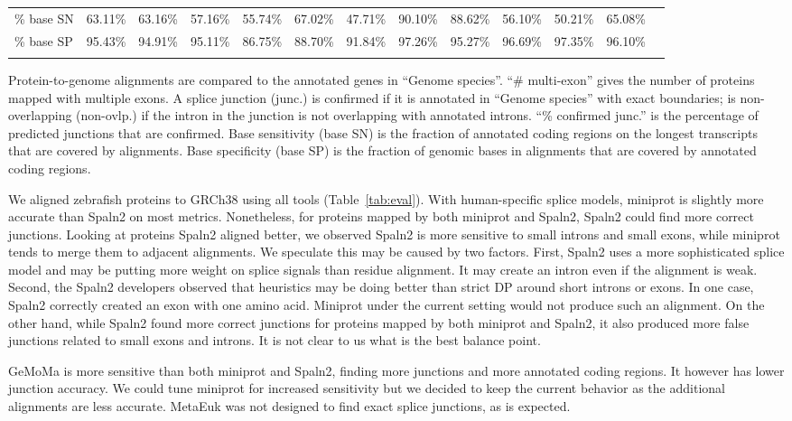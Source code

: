 \documentclass{bioinfo}
\begin{document}
\begin{table*}[!tb]
{\begin{tabular*}{\textwidth}{@{\extracolsep{\fill}}lrrrrrrrrrrrr}
\% base SN         & 63.11\% & 63.16\% & 57.16\% & 55.74\% & 67.02\% & 47.71\% & 90.10\% & 88.62\% & 56.10\% & 50.21\% &  65.08\% \\
\% base SP         & 95.43\% & 94.91\% & 95.11\% & 86.75\% & 88.70\% & 91.84\% & 97.26\% & 95.27\% & 96.69\% & 97.35\% &  96.10\% \\
\botrule
\end{tabular*}
}{Protein-to-genome alignments are compared to the annotated genes in ``Genome
species''. ``\# multi-exon'' gives the number of proteins mapped with multiple exons.
A splice junction (junc.) is confirmed if it is annotated in ``Genome species''
with exact boundaries; is non-overlapping (non-ovlp.) if the intron in the
junction is not overlapping with annotated introns. ``\% confirmed junc.'' is
the percentage of predicted junctions that are confirmed. Base
sensitivity (base SN) is the fraction of annotated coding regions on the
longest transcripts that are covered by alignments. Base specificity (base SP)
is the fraction of genomic bases in alignments that are covered by annotated
coding regions.}
\end{table*}

We aligned zebrafish proteins to GRCh38 using all tools (Table~\ref{tab:eval}).
With human-specific splice models, miniprot is slightly more accurate than
Spaln2 on most metrics. Nonetheless, for proteins mapped by both miniprot and
Spaln2, Spaln2 could find more correct junctions. Looking at proteins Spaln2
aligned better, we observed Spaln2 is more sensitive to small introns and small
exons, while
miniprot tends to merge them to adjacent alignments. We speculate this may be
caused by two factors. First, Spaln2 uses a more sophisticated splice model and
may be putting more weight on splice signals than residue alignment. It may
create an intron even if the alignment is weak. Second, the Spaln2 developers
observed that heuristics may be doing better than strict DP around short
introns or exons. In one case, Spaln2 correctly created an exon with one amino
acid. Miniprot under the current setting would not produce such an alignment.
On the other hand, while Spaln2 found more correct junctions for proteins
mapped by both miniprot and Spaln2, it also produced more false junctions
related to small exons and introns. It is not clear to us what is the best
balance point.

GeMoMa is more sensitive than both miniprot and Spaln2, finding more junctions
and more annotated coding regions. It however has lower junction accuracy. We
could tune miniprot for increased sensitivity but we decided to keep the
current behavior as the additional alignments are less accurate. MetaEuk was
not designed to find exact splice junctions, as is expected.
\end{document}
